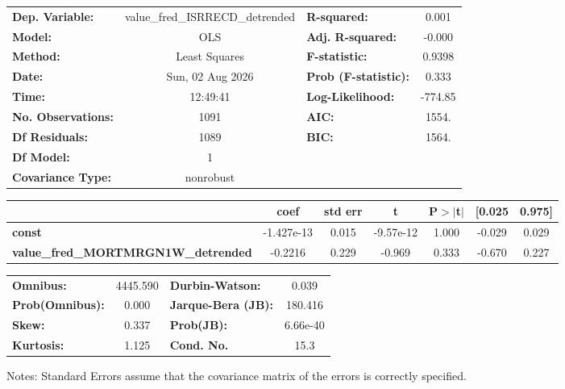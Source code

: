 \begin{center}
\begin{tabular}{lclc}
\toprule
\textbf{Dep. Variable:}                     & value\_fred\_ISRRECD\_detrended & \textbf{  R-squared:         } &     0.001   \\
\textbf{Model:}                             &               OLS               & \textbf{  Adj. R-squared:    } &    -0.000   \\
\textbf{Method:}                            &          Least Squares          & \textbf{  F-statistic:       } &    0.9398   \\
\textbf{Date:}                              &         Sun, 02 Aug 2026        & \textbf{  Prob (F-statistic):} &    0.333    \\
\textbf{Time:}                              &             12:49:41            & \textbf{  Log-Likelihood:    } &   -774.85   \\
\textbf{No. Observations:}                  &                1091             & \textbf{  AIC:               } &     1554.   \\
\textbf{Df Residuals:}                      &                1089             & \textbf{  BIC:               } &     1564.   \\
\textbf{Df Model:}                          &                   1             & \textbf{                     } &             \\
\textbf{Covariance Type:}                   &            nonrobust            & \textbf{                     } &             \\
\bottomrule
\end{tabular}
\begin{tabular}{lcccccc}
                                            & \textbf{coef} & \textbf{std err} & \textbf{t} & \textbf{P$> |$t$|$} & \textbf{[0.025} & \textbf{0.975]}  \\
\midrule
\textbf{const}                              &   -1.427e-13  &        0.015     & -9.57e-12  &         1.000        &       -0.029    &        0.029     \\
\textbf{value\_fred\_MORTMRGN1W\_detrended} &      -0.2216  &        0.229     &    -0.969  &         0.333        &       -0.670    &        0.227     \\
\bottomrule
\end{tabular}
\begin{tabular}{lclc}
\textbf{Omnibus:}       & 4445.590 & \textbf{  Durbin-Watson:     } &    0.039  \\
\textbf{Prob(Omnibus):} &   0.000  & \textbf{  Jarque-Bera (JB):  } &  180.416  \\
\textbf{Skew:}          &   0.337  & \textbf{  Prob(JB):          } & 6.66e-40  \\
\textbf{Kurtosis:}      &   1.125  & \textbf{  Cond. No.          } &     15.3  \\
\bottomrule
\end{tabular}
\end{center}

Notes: \newline
 [1] Standard Errors assume that the covariance matrix of the errors is correctly specified.